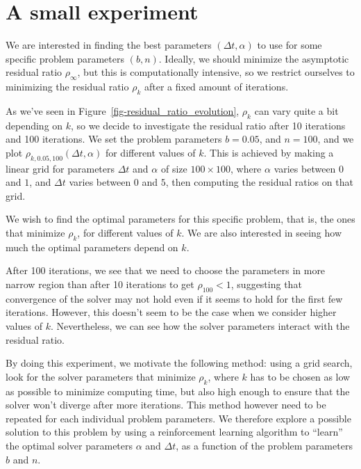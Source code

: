 \documentclass[
  letterpaper,
]{report}
\theoremstyle{plain}
\theoremstyle{definition}
\theoremstyle{definition}
\theoremstyle{remark}
\begin{document}
\hypertarget{sec-small_experiment}{%
\section{A small experiment}\label{sec-small_experiment}}

We are interested in finding the best parameters \((\Delta t, \alpha)\)
to use for some specific problem parameters \((b,n)\). Ideally, we
should minimize the asymptotic residual ratio \(\rho_\infty\), but this
is computationally intensive, so we restrict ourselves to minimizing the
residual ratio \(\rho_k\) after a fixed amount of iterations.

As we've seen in Figure~\ref{fig-residual_ratio_evolution}, \(\rho_k\)
can vary quite a bit depending on \(k\), so we decide to investigate the
residual ratio after 10 iterations and 100 iterations. We set the
problem parameters \(b = 0.05\), and \(n = 100\), and we plot
\(\rho_{k,0.05,100}(\Delta t, \alpha)\) for different values of \(k\).
This is achieved by making a linear grid for parameters \(\Delta t\) and
\(\alpha\) of size \(100\times 100\), where \(\alpha\) varies between
\(0\) and \(1\), and \(\Delta t\) varies between \(0\) and \(5\), then
computing the residual ratios on that grid.

We wish to find the optimal parameters for this specific problem, that
is, the ones that minimize \(\rho_{k}\), for different values of \(k\).
We are also interested in seeing how much the optimal parameters depend
on \(k\).

After 100 iterations, we see that we need to choose the parameters in
more narrow region than after 10 iterations to get \(\rho_{100}<1\),
suggesting that convergence of the solver may not hold even if it seems
to hold for the first few iterations. However, this doesn't seem to be
the case when we consider higher values of \(k\). Nevertheless, we can
see how the solver parameters interact with the residual ratio.

By doing this experiment, we motivate the following method: using a grid
search, look for the solver parameters that minimize \(\rho_k\), where
\(k\) has to be chosen as low as possible to minimize computing time,
but also high enough to ensure that the solver won't diverge after more
iterations. This method however need to be repeated for each individual
problem parameters. We therefore explore a possible solution to this
problem by using a reinforcement learning algorithm to ``learn'' the
optimal solver parameters \(\alpha\) and \(\Delta t\), as a function of
the problem parameters \(b\) and \(n\).
\end{document}
